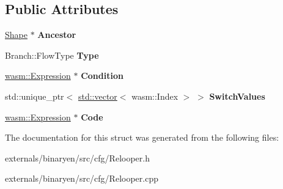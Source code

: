 \subsection*{Public Attributes}
\begin{DoxyCompactItemize}
\item 
\mbox{\label{struct_c_f_g_1_1_branch_a7da8eb83098b4053a45794ce8cf10027}} 
\mbox{\hyperlink{struct_c_f_g_1_1_shape}{Shape}} $\ast$ {\bfseries Ancestor}
\item 
\mbox{\label{struct_c_f_g_1_1_branch_af3403f3f0dfa72b1f6a37503568da32a}} 
Branch\+::\+Flow\+Type {\bfseries Type}
\item 
\mbox{\label{struct_c_f_g_1_1_branch_a8fc9f3ebfd8918ef75928552050aaabe}} 
\mbox{\hyperlink{classwasm_1_1_expression}{wasm\+::\+Expression}} $\ast$ {\bfseries Condition}
\item 
\mbox{\label{struct_c_f_g_1_1_branch_a3120dc26eaa984284ca182ec0da15c04}} 
std\+::unique\+\_\+ptr$<$ \mbox{\hyperlink{classstd_1_1vector}{std\+::vector}}$<$ wasm\+::\+Index $>$ $>$ {\bfseries Switch\+Values}
\item 
\mbox{\label{struct_c_f_g_1_1_branch_a5483d1f4fe1379aaeca63d4d03624ce1}} 
\mbox{\hyperlink{classwasm_1_1_expression}{wasm\+::\+Expression}} $\ast$ {\bfseries Code}
\end{DoxyCompactItemize}


The documentation for this struct was generated from the following files\+:\begin{DoxyCompactItemize}
\item 
externals/binaryen/src/cfg/Relooper.\+h\item 
externals/binaryen/src/cfg/Relooper.\+cpp\end{DoxyCompactItemize}
